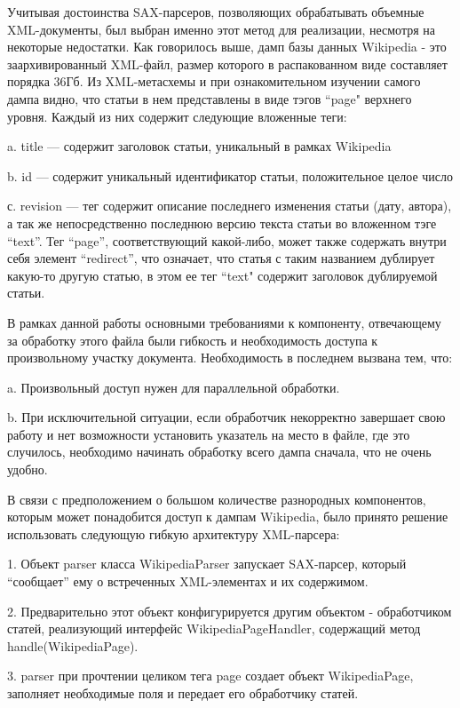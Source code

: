 Учитывая достоинства SAX-парсеров, позволяющих обрабатывать объемные XML-документы, 
был выбран именно этот метод для реализации, несмотря на некоторые недостатки.
Как говорилось выше, дамп базы данных Wikipedia \cite{dump} - это заархивированный XML-файл, размер которого 
в распакованном виде составляет порядка 36Гб. Из XML-метасхемы \cite{schema} 
и при ознакомительном изучении самого дампа видно, что статьи в нем представлены в виде 
тэгов ``page" верхнего уровня. Каждый из них содержит следующие вложенные теги:

a. title --- содержит заголовок статьи, уникальный в рамках Wikipedia

b. id --- содержит уникальный идентификатор статьи, положительное целое число

с. revision --- тег содержит описание последнего изменения статьи (дату, автора), 
а так же непосредственно последнюю версию текста статьи во вложенном тэге ``text''. 
Тег ``page'', соответствующий какой-либо, может также содержать внутри себя %
элемент “redirect”, что означает, что статья с таким названием дублирует 
какую-то другую статью, в этом ее тег ``text" содержит заголовок дублируемой статьи. 

В рамках данной работы основными требованиями к компоненту, отвечающему 
за обработку этого файла были гибкость и необходимость доступа к произвольному участку документа.
Необходимость в последнем вызвана тем, что:

a. Произвольный доступ нужен для параллельной обработки.

b. При исключительной ситуации, если обработчик некорректно завершает свою работу и 
нет возможности установить указатель на место в файле, где это случилось,
необходимо начинать обработку всего дампа сначала, что не очень удобно.

В связи с предположением о большом количестве разнородных компонентов,
которым может понадобится доступ к дампам Wikipedia, было принято решение 
использовать следующую гибкую архитектуру XML-парсера:

1. Объект parser класса WikipediaParser запускает SAX-парсер, который “сообщает” 
ему о встреченных XML-элементах и их содержимом.

2. Предварительно этот объект конфигурируется другим объектом - обработчиком статей,
 реализующий интерфейс WikipediaPageHandler, содержащий метод handle(WikipediaPage).

3. parser при прочтении целиком тега page создает объект WikipediaPage, заполняет 
необходимые поля и передает его обработчику статей.

